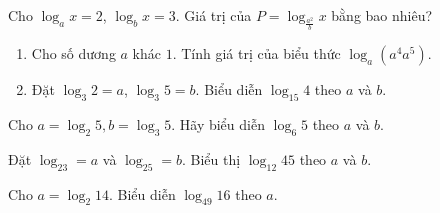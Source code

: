 \begin{ex}%
	Cho $\log_{a} x=2$, $\log_{b} x=3$. Giá trị của $P=\log_{\tfrac{a^2}{b}} x$ bằng  bao nhiêu?
\end{ex}

\begin{ex}%
	\begin{enumerate}
		\item Cho số dương $a$ khác $1$. Tính giá trị của biểu thức $\log_a\left(a^4a^5\right) $. 
		\item Đặt $\log _3 2=a$, $\log _3 5=b$. Biểu diễn $\log _{15}  4$ theo $a$ và $b$.
	\end{enumerate}
\end{ex}

\begin{ex}%
	Cho  $a=\log _2 5, b=\log _3 5$. Hãy biểu diễn $\log _6 5$ theo $a$ và $b$.
\end{ex}

\begin{ex}%
	Đặt $\log_23=a$ và $\log_25=b$.  Biểu thị $\log_{12}45$ theo $a$ và $b$.
\end{ex}

\begin{ex}%
	Cho $a=\log_2  14$. Biểu diễn $\log_{49}16 $ theo $a$.
\end{ex}

